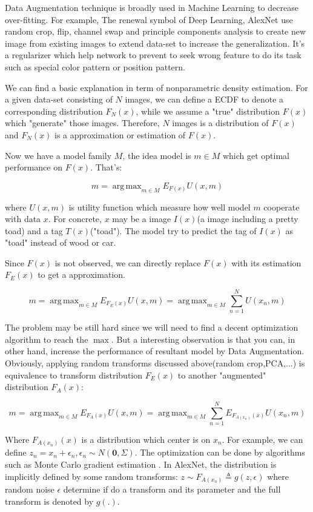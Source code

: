 \documentclass{article}
\DeclareMathOperator*{\argmax}{arg\,max}
\begin{document}
Data Augmentation technique is broadly used in Machine Learning to decrease over-fitting.
For example, The renewal symbol of Deep Learning, 
AlexNet \cite{krizhevsky2012imagenet} use random crop, flip, channel swap and
principle components analysis to create new image from existing images to extend data-set to increase
the generalization. It's a regularizer which help network to prevent to seek wrong feature to do its task such as
special color pattern or position pattern.

We can find a basic explanation in term of nonparametric density estimation. 
For a given data-set consisting of $N$ images, 
we can define a ECDF to denote a corresponding distribution $F_N(x)$,
while we assume a "true" distribution $F(x)$ which "generate" those images.
Therefore, $N$ images is a distribution of $F(x)$ and $F_N(x)$ is a approximation or estimation of $F(x)$.

Now we have a model family $M$, the idea model is $m \in M$ which get optimal performance on $F(x)$.
That's:

$$
m = \argmax_{m \in M} E_{F(x)} U(x,m)
$$

where $U(x,m)$ is utility function which measure how well model $m$ cooperate with data $x$.
For concrete, $x$ may be a image $I(x)$(a image including a pretty toad) and a tag $T(x)$("toad").
The model try to predict the tag of $I(x)$ as "toad" instead of wood or car.

Since $F(x)$ is not observed, we can directly replace $F(x)$ with its estimation $F_E(x)$ to get a approximation.

$$
m = \argmax_{m \in M} E_{F_E(x)} U(x,m) = \argmax_{m \in M} \sum_{n=1}^N U(x_n, m)
$$

The problem may be still hard since we will need to find a decent optimization algorithm to reach the $\max$.
But a interesting observation is that you can, in other hand, increase the performance of resultant model
by Data Augmentation. 
Obviously, applying random transforms discussed above(random crop,PCA,...) is equivalence to 
transform distribution $F_E(x)$ to another "augmented" distribution $F_A(x)$: 

$$
m = \argmax_{m \in M} E_{F_A(x)} U(x,m) = \argmax_{m \in M} \sum_{n=1}^N E_{F_{A(x_n)}(x)} U(x_n, m)
$$

Where $F_{A(x_n)}(x)$ is a distribution which center is on $x_n$.
For example, we can define $z_n = x_n + \epsilon_n, \epsilon_n \sim N(\mathbf{0}, \Sigma)$.
The optimization can be done by algorithms such as Monte Carlo gradient estimation \cite{Weber2015Gradient}.
In AlexNet\cite{krizhevsky2012imagenet}, the distribution is implicitly defined by some random transforms:
$z \sim F_{A(x_n)} \triangleq g(z,\epsilon)$ where random noise $\epsilon$ determine if do a transform and 
its parameter and the full transform is denoted by $g(.)$.
\end{document}
